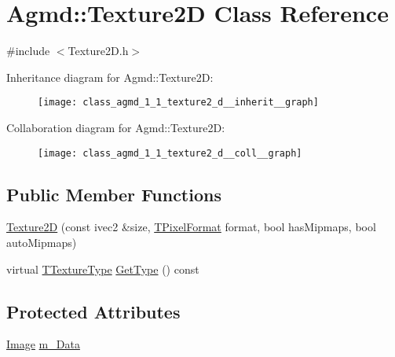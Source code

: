 \hypertarget{class_agmd_1_1_texture2_d}{\section{Agmd\+:\+:Texture2\+D Class Reference}
\label{class_agmd_1_1_texture2_d}
}


{\ttfamily \#include $<$Texture2\+D.\+h$>$}



Inheritance diagram for Agmd\+:\+:Texture2\+D\+:\nopagebreak
\begin{figure}[H]
\begin{center}
\leavevmode
\texttt{[image: class\_agmd\_1\_1\_texture2\_d\_\_inherit\_\_graph]}
\end{center}
\end{figure}


Collaboration diagram for Agmd\+:\+:Texture2\+D\+:\nopagebreak
\begin{figure}[H]
\begin{center}
\leavevmode
\texttt{[image: class\_agmd\_1\_1\_texture2\_d\_\_coll\_\_graph]}
\end{center}
\end{figure}
\subsection*{Public Member Functions}
\begin{DoxyCompactItemize}
\item 
\hyperlink{class_agmd_1_1_texture2_d_ab8d5908a6e1036311ae21c81e2cefa06}{Texture2\+D} (const ivec2 \&size, \hyperlink{namespace_agmd_afc48fd9fa5dccb4c5621c052bfd1a7ec}{T\+Pixel\+Format} format, bool has\+Mipmaps, bool auto\+Mipmaps)
\item 
virtual \hyperlink{namespace_agmd_a7036bece09449a930cfec410f75e85f4}{T\+Texture\+Type} \hyperlink{class_agmd_1_1_texture2_d_a0e99997ddede5a08b62f4a721331805e}{Get\+Type} () const 
\end{DoxyCompactItemize}
\subsection*{Protected Attributes}
\begin{DoxyCompactItemize}
\item 
\hyperlink{class_agmd_1_1_image}{Image} \hyperlink{class_agmd_1_1_texture2_d_a364f4407132d02473df2398198614646}{m\+\_\+\+Data}
\end{DoxyCompactItemize}
